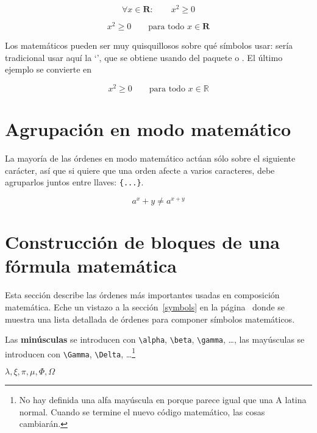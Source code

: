 \begin{example}
\begin{equation}
\forall x \in \mathbf{R}:
\qquad x^{2} \geq 0
\end{equation}
\end{example}

\begin{example}
\begin{equation}
x^{2} \geq 0\qquad
\textrm{para todo }x\in\mathbf{R}
\end{equation}
\end{example}
 
%
%
Los matemáticos pueden ser muy quisquillosos sobre qué símbolos usar: sería tradicional usar aquí la `',  que se obtiene usando  del paquete  o .
\ifx\mathbb\undefined\else El último ejemplo se convierte en
\begin{example}
\begin{displaymath}
x^{2} \geq 0\qquad
\textrm{para todo }x\in\mathbb{R}
\end{displaymath}
\end{example}
\fi

\section{Agrupación en modo matemático}

La mayoría de las órdenes en modo matemático actúan sólo sobre el siguiente carácter, así que si quiere que una orden afecte a varios caracteres, debe agruparlos juntos entre llaves: \verb|{...}|. 
\begin{example}
\begin{equation}
a^x+y \neq a^{x+y}
\end{equation}
\end{example}

\section{Construcción de bloques de una fórmula matemática}

Esta sección describe las órdenes más importantes usadas en composición matemática.  Eche un vistazo a la sección~\ref{symbols} en la página~\pageref{symbols} donde se muestra una lista detallada de órdenes para componer símbolos matemáticos.

Las \textbf{ minúsculas} se introducen con \verb|\alpha|, \verb|\beta|, \verb|\gamma|, \ldots, las mayúsculas se introducen con \verb|\Gamma|, \verb|\Delta|, \ldots\footnote{No hay definida una alfa mayúscula en \LaTeXe{} porque parece igual que una A latina normal.  Cuando se termine el nuevo código matemático, las cosas cambiarán.}
\begin{example}
$\lambda,\xi,\pi,\mu,\Phi,\Omega$
\end{example}

